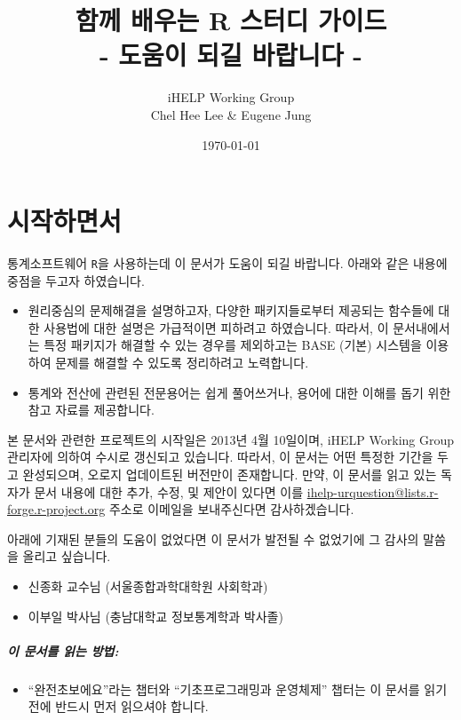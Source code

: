 \documentclass{report}
\title{함께 배우는 R 스터디 가이드 \\ - 도움이 되길 바랍니다 -}
\author{iHELP Working Group \\ Chel Hee Lee \& Eugene Jung }
\date{\today}
\begin{document}
\maketitle



\chapter{시작하면서}

통계소프트웨어 \texttt{R}을 사용하는데 이 문서가 도움이 되길 바랍니다. 
아래와 같은 내용에 중점을 두고자 하였습니다. 

\begin{itemize}
\item 원리중심의 문제해결을 설명하고자, 다양한 패키지들로부터 제공되는 함수들에 대한 사용법에 대한 설명은 가급적이면 피하려고 하였습니다.
따라서, 이 문서내에서는 특정 패키지가 해결할 수 있는 경우를 제외하고는 BASE (기본) 시스템을 이용하여 문제를 해결할 수 있도록 정리하려고 노력합니다.
\item 통계와 전산에 관련된 전문용어는 쉽게 풀어쓰거나, 용어에 대한 이해를 돕기 위한 참고 자료를 제공합니다. 
\end{itemize}

본 문서와 관련한 프로젝트의 시작일은 2013년 4월 10일이며, iHELP Working Group 관리자에 의하여 수시로 갱신되고 있습니다.
따라서, 이 문서는 어떤 특정한 기간을 두고 완성되으며, 오로지 업데이트된 버전만이 존재합니다.
만약, 이 문서를 읽고 있는 독자가 문서 내용에 대한 추가, 수정, 및 제안이 있다면 이를 \href{mailto:ihelp-urquestion@lists.r-forge.r-project.org}{ihelp-urquestion@lists.r-forge.r-project.org} 주소로 이메일을 보내주신다면 감사하겠습니다. 

아래에 기재된 분들의 도움이 없었다면 이 문서가 발전될 수 없었기에 그 감사의 말씀을 올리고 싶습니다. 
\begin{itemize}
\item 신종화 교수님 (서울종합과학대학원 사회학과)
\item 이부일 박사님 (충남대학교 정보통계학과 박사졸)
\end{itemize}

\paragraph{이 문서를 읽는 방법:} 
\begin{itemize}
\item ``완전초보에요''라는 챕터와 ``기초프로그래밍과 운영체제'' 챕터는 이 문서를 읽기 전에 반드시 먼저 읽으셔야 합니다.  
\end{itemize}
\end{document}
